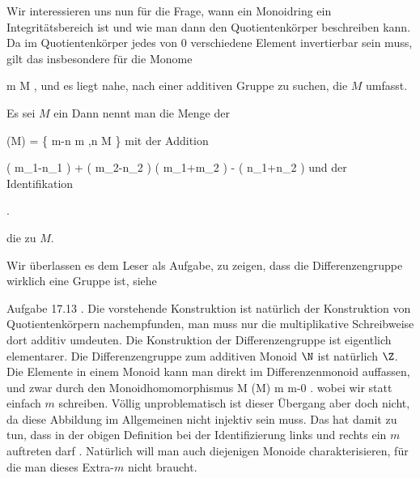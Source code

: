 
Wir interessieren uns nun für die Frage, wann ein Monoidring ein Integritätsbereich ist
 {} {}
und wie man dann den Quotientenkörper beschreiben kann. Da im Quotientenkörper jedes von $0$ verschiedene Element invertierbar sein muss, gilt das insbesondere für die Monome

 {}
 {m \in M} {}
 {} {} {} {,}
und es liegt nahe, nach einer additiven Gruppe zu suchen, die $M$ umfasst.


{}
{





Es sei $M$ ein
Dann nennt man die Menge der 

\mavergleichskettedisp
{\vergleichskette
{ \Gamma(M)
}
{ =} { \left\{  m-n  \mid   m ,n \in M         \right\}
}
{ } {
}
{ } {
}
{ } {
}
}
{}{}{}
mit der Addition

\mavergleichskettedisp
{\vergleichskette
{ \left(  m_1-n_1  \right)  + \left(  m_2-n_2  \right)
}
{ } { \left(  m_1+m_2  \right)  - \left(  n_1+n_2  \right)
}
{ } {
}
{ } {
}
{ } {
}
}
{}{}{}
und der Identifikation

 { . }

die  zu $M$.





}

Wir überlassen es dem Leser als Aufgabe, zu zeigen, dass die Differenzengruppe wirklich eine Gruppe ist, siehe

Aufgabe 17.13
.
Die vorstehende Konstruktion ist natürlich der Konstruktion von Quotientenkörpern nachempfunden, man muss nur die multiplikative Schreibweise dort additiv umdeuten. Die Konstruktion der Differenzengruppe ist eigentlich elementarer. Die Differenzengruppe zum additiven Monoid $\N$ ist natürlich $\Z$. Die Elemente in einem Monoid kann man direkt im Differenzenmonoid auffassen, und zwar durch den Monoidhomomorphismus
\maabbeledisp {} { M } { \Gamma(M)
} { m } { m-0
} {.}
wobei wir statt
 einfach $m$ schreiben. Völlig unproblematisch ist dieser Übergang aber doch nicht, da diese Abbildung im Allgemeinen nicht injektiv sein muss. Das hat damit zu tun, dass in der obigen Definition bei der Identifizierung links und rechts ein $m$ auftreten darf
 {} {.}
Natürlich will man auch diejenigen Monoide charakterisieren, für die man dieses Extra-$m$ nicht braucht.



